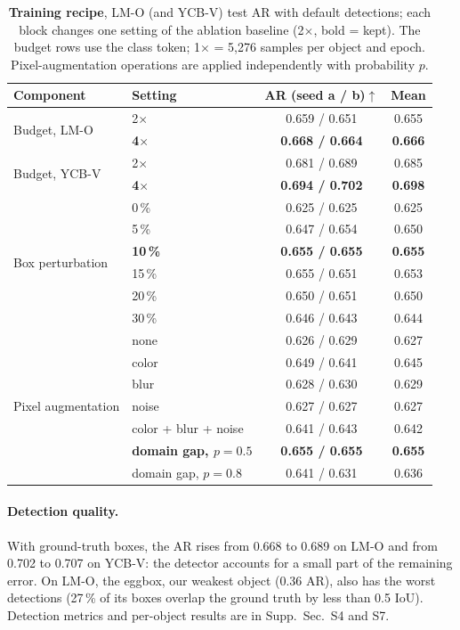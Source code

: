 \begin{table}[t]
  \centering
  \setlength{\tabcolsep}{4pt}
  \small
  \begin{tabular}{llcc}
    \toprule
    Component & Setting & AR (seed a / b)$\uparrow$ & Mean \\
    \midrule
    \multirow{2}{*}{Budget, LM-O} & 2$\times$ & 0.659 / 0.651 & 0.655 \\
     & \textbf{4$\times$} & \textbf{0.668 / 0.664} & \textbf{0.666} \\
    \multirow{2}{*}{Budget, YCB-V} & 2$\times$ & 0.681 / 0.689 & 0.685 \\
     & \textbf{4$\times$} & \textbf{0.694 / 0.702} & \textbf{0.698} \\
    \midrule
    \multirow{6}{*}{Box perturbation} & 0\,\% & 0.625 / 0.625 & 0.625 \\
     & 5\,\% & 0.647 / 0.654 & 0.650 \\
     & \textbf{10\,\%} & \textbf{0.655 / 0.655} & \textbf{0.655} \\
     & 15\,\% & 0.655 / 0.651 & 0.653 \\
     & 20\,\% & 0.650 / 0.651 & 0.650 \\
     & 30\,\% & 0.646 / 0.643 & 0.644 \\
    \midrule
    \multirow{7}{*}{Pixel augmentation} & none & 0.626 / 0.629 & 0.627 \\
     & color & 0.649 / 0.641 & 0.645 \\
     & blur & 0.628 / 0.630 & 0.629 \\
     & noise & 0.627 / 0.627 & 0.627 \\
     & color + blur + noise & 0.641 / 0.643 & 0.642 \\
     & \textbf{domain gap, $p = 0.5$} & \textbf{0.655 / 0.655} & \textbf{0.655} \\
     & domain gap, $p = 0.8$ & 0.641 / 0.631 & 0.636 \\
    \bottomrule
  \end{tabular}
  \caption{\textbf{Training recipe}, LM-O (and YCB-V) test AR with default detections; each block
  changes one setting of the ablation baseline (2$\times$, bold = kept). The budget rows use the
  class token; 1$\times$ = 5,276 samples per object and epoch. Pixel-augmentation operations are
  applied independently with probability $p$.}
  \label{tab:abl_recipe}
\end{table}

\paragraph{Detection quality.}
With ground-truth boxes, the AR rises from 0.668 to 0.689 on LM-O and from 0.702 to 0.707 on
YCB-V: the detector accounts for a small part of the remaining error. On LM-O, the eggbox, our
weakest object (0.36 AR), also has the worst detections (27\,\% of its boxes overlap the ground
truth by less than 0.5 IoU). Detection metrics and per-object results are in Supp.~Sec.~S4 and
S7.

